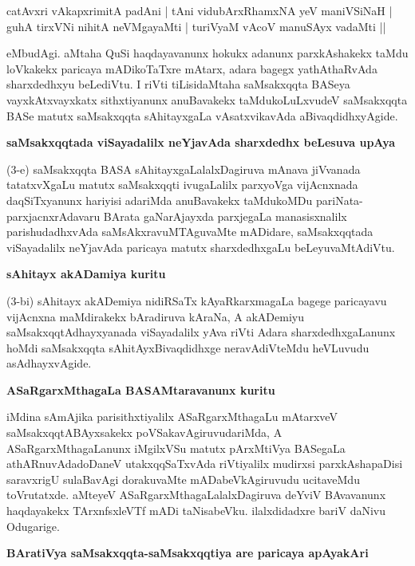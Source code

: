 \smallskip
\begin{shloka}
catAvxri vAkapxrimitA padAni | tAni vidubArxRhamxNA yeV maniVSiNaH |\\\label{31}
guhA tirxVNi nihitA neVMgayaMti | turiVyaM vAcoV manuSAyx vadaMti ||
\end{shloka}
\smallskip

eMbudAgi. aMtaha QuSi haqdayavanunx hokukx adanunx parxkAshakekx taMdu loVkakekx paricaya mADi\-koTaTxre mAtarx, adara bagegx yathAthaRvAda sharxdedhxyu beLediVtu. I riVti tiLisidaMtaha saMsakxqqta BASeya vayxkAtxvayxkatx sithxtiyanunx anuBavakekx taMdukoLuLxvudeV saMsakxqqta BASe matutx saMsakxqqta sAhitayxgaLa vAsatxvikavAda aBivaqdidhxyAgide.

\newpage

{\bigskip
\noindent
{\large\bf saMsakxqqtada viSayadalilx neYjavAda sharxdedhx beLesuva upAya}}\label{page31b}
\medskip

\noindent
(3-e) saMsakxqqta BASA sAhitayxgaLalalxDagiruva mAnava jiVvanada tatatxvXgaLu matutx saMsakxqqti ivu\-gaLalilx parxyoVga vijAcnxnada daqSiTxyanunx hariyisi adariMda anuBavakekx taMdukoMDu pariNata-parxjacnx\-rAdavaru BArata gaNarAjayxda parxjegaLa manasisxnalilx pari\-shudadhxvAda saMsAkxravuMTAguvaMte mADi\-dare, saMsakxqqtada viSayadalilx neYjavAda paricaya matutx sharxdedhxgaLu beLeyuvaMtAdiVtu.

{\bigskip
\noindent
{\large\bf sAhitayx akADamiya kuritu}}\label{page30d}
\medskip

\noindent
(3-bi) sAhitayx akADemiya nidiRSaTx kAyaRkarxmagaLa bagege paricayavu vijAcnxna maMdirakekx bAra\-diruva kAraNa, A akADemiyu saMsakxqqtAdhayxyanada viSayadalilx yAva riVti Adara sharxdedhxgaLanunx hoMdi saMsakxqqta sAhitAyxBivaqdidhxge neravAdiVteMdu heVLuvudu asAdhayxvAgide.

{\bigskip
\noindent
{\large\bf ASaRgarxMthagaLa BASAMtaravanunx kuritu}}\label{page30c}
\medskip

\noindent
iMdina sAmAjika parisithxtiyalilx ASaRgarxMthagaLu mAtarxveV saMsakxqqtABAyxsakekx poVSakavAgiruvuda\-riMda, A ASaRgarxMthagaLanunx iMgilxVSu matutx pArxMtiVya BASegaLa athARnuvAdadoDaneV utakxqqSaTx\-vAda riVti\-yalilx mudirxsi parxkAshapaDisi saravxrigU sulaBavAgi dorakuvaMte mADabeVkAgiruvudu ucita\-veMdu toVru\-tatxde. aMteyeV ASaRgarxMthagaLalalxDagiruva deYviV BAvavanunx haqdayakekx TArxnfsxleVTf mADi taNisa\-beVku. ilalxdidadxre bariV daNivu Odugarige. 

{\bigskip
\noindent
{\large\bf BAratiVya saMsakxqqta-saMsakxqqtiya are paricaya apAyakAri}}\label{page30}
\medskip

